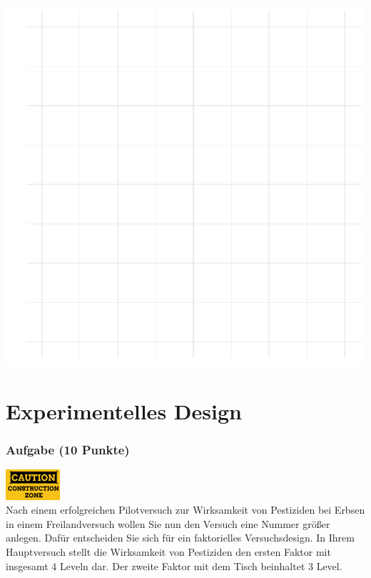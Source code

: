 \documentclass[a4paper, 9pt]{scrartcl}\usepackage[]{graphicx}\usepackage[]{xcolor}
\makeatletter
\def\maxwidth{ %
  \ifdim\Gin@nat@width>\linewidth
    \linewidth
  \else
    \Gin@nat@width
  \fi
}
\makeatother
\begin{document}
{\centering \includegraphics[width=\maxwidth]{img/modeling-R-01-1} 

}


 
\clearpage
\part{Experimentelles Design}

\section{Aufgabe \hfill (10 Punkte)}

\hfill\href{}{\includegraphics[width =
  2cm]{img/caution}}\\[1Ex]



Nach einem erfolgreichen Pilotversuch zur Wirksamkeit von Pestiziden bei
Erbsen in einem Freilandversuch wollen Sie nun den Versuch eine Nummer gr{\"o}{\ss}er
anlegen. Daf{\"u}r entscheiden Sie sich f{\"u}r ein faktorielles Versuchsdesign. In
Ihrem Hauptversuch stellt die Wirksamkeit von Pestiziden den ersten Faktor
mit insgesamt 4 Leveln dar. Der zweite Faktor mit dem Tisch
beinhaltet
3 Level. \\
\end{document}

